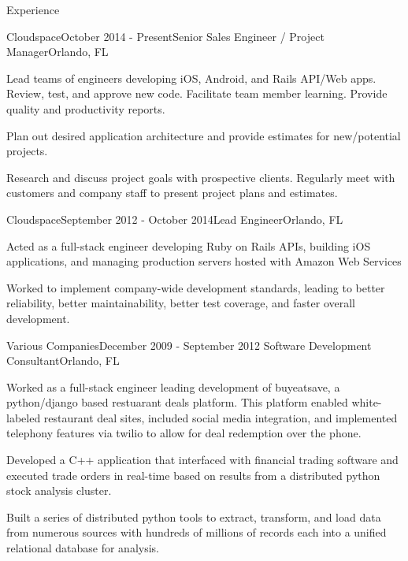 \documentclass{resume} %
\begin{document}
\begin{rSection}{Experience}


\begin{rSubsection}{Cloudspace}{October 2014 - Present}{Senior Sales Engineer / Project Manager}{Orlando, FL}

\item Lead teams of engineers developing iOS, Android, and Rails API/Web apps.  Review, test, and approve new code.  Facilitate team member learning.  Provide quality and productivity reports.
\item Plan out desired application architecture and provide estimates for new/potential projects.
\item Research and discuss project goals with prospective clients. Regularly meet with customers and company staff to present project plans and estimates.

\end{rSubsection}




\begin{rSubsection}{Cloudspace}{September 2012 - October 2014}{Lead Engineer}{Orlando, FL}

\item Acted as a full-stack engineer developing Ruby on Rails APIs, building iOS applications, and managing production servers hosted with Amazon Web Services
\item Worked to implement company-wide development standards, leading to better reliability, better maintainability, better test coverage, and faster overall development.

\end{rSubsection}


\begin{rSubsection}{Various Companies}{December 2009 - September 2012}{ Software Development Consultant}{Orlando, FL}

\item Worked as a full-stack engineer leading development of buyeatsave, a python/django based restuarant deals platform.  This platform enabled white-labeled restaurant deal sites, included social media integration, and implemented telephony features via twilio to allow for deal redemption over the phone.
\item Developed a C++ application that interfaced with financial trading software and executed trade orders in real-time based on results from a distributed python stock analysis cluster.
\item Built a series of distributed python tools to extract, transform, and load data from numerous sources with hundreds of millions of records each into a unified relational database for analysis.



\end{rSubsection}
\end{rSection}
\end{document}
